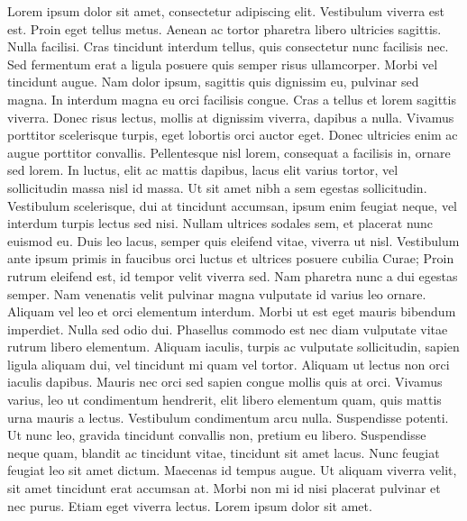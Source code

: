 \begin{titlingpage}
\DoubleSpacing
\noindent Lorem ipsum dolor sit amet, consectetur adipiscing elit. Vestibulum viverra est est. Proin eget tellus metus. Aenean ac tortor pharetra libero ultricies sagittis. Nulla facilisi. Cras tincidunt interdum tellus, quis consectetur nunc facilisis nec. Sed fermentum erat a ligula posuere quis semper risus ullamcorper. Morbi vel tincidunt augue. Nam dolor ipsum, sagittis quis dignissim eu, pulvinar sed magna. In interdum magna eu orci facilisis congue. Cras a tellus et lorem sagittis viverra. Donec risus lectus, mollis at dignissim viverra, dapibus a nulla. Vivamus porttitor scelerisque turpis, eget lobortis orci auctor eget. Donec ultricies enim ac augue porttitor convallis. Pellentesque nisl lorem, consequat a facilisis in, ornare sed lorem. In luctus, elit ac mattis dapibus, lacus elit varius tortor, vel sollicitudin massa nisl id massa.  Ut sit amet nibh a sem egestas sollicitudin. Vestibulum scelerisque, dui at tincidunt accumsan, ipsum enim feugiat neque, vel interdum turpis lectus sed nisi. Nullam ultrices sodales sem, et placerat nunc euismod eu. Duis leo lacus, semper quis eleifend vitae, viverra ut nisl. Vestibulum ante ipsum primis in faucibus orci luctus et ultrices posuere cubilia Curae; Proin rutrum eleifend est, id tempor velit viverra sed. Nam pharetra nunc a dui egestas semper. Nam venenatis velit pulvinar magna vulputate id varius leo ornare. Aliquam vel leo et orci elementum interdum. Morbi ut est eget mauris bibendum imperdiet.  Nulla sed odio dui. Phasellus commodo est nec diam vulputate vitae rutrum libero elementum. Aliquam iaculis, turpis ac vulputate sollicitudin, sapien ligula aliquam dui, vel tincidunt mi quam vel tortor. Aliquam ut lectus non orci iaculis dapibus. Mauris nec orci sed sapien congue mollis quis at orci. Vivamus varius, leo ut condimentum hendrerit, elit libero elementum quam, quis mattis urna mauris a lectus. Vestibulum condimentum arcu nulla. Suspendisse potenti. Ut nunc leo, gravida tincidunt convallis non, pretium eu libero. Suspendisse neque quam, blandit ac tincidunt vitae, tincidunt sit amet lacus. Nunc feugiat feugiat leo sit amet dictum. Maecenas id tempus augue. Ut aliquam viverra velit, sit amet tincidunt erat accumsan at. Morbi non mi id nisi placerat pulvinar et nec purus. Etiam eget viverra lectus. Lorem ipsum dolor sit amet.

\vfill


\end{titlingpage}